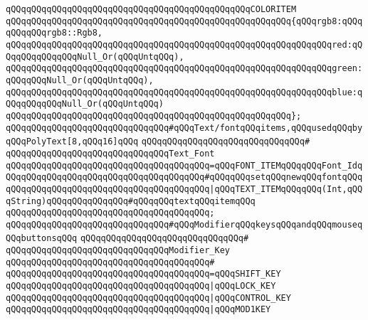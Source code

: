 \verb|qQQqqQQqqQQqqQQqqQQqqQQqqQQqqQQqqQQqqQQqqQQqqQQqCOLORITEM|\newline
\verb|qQQqqQQqqQQqqQQqqQQqqQQqqQQqqQQqqQQqqQQqqQQqqQQqqQQqqQQq{qQQqrgb8:qQQqqQQqqQQqrgb8::Rgb8,|\newline
\verb|qQQqqQQqqQQqqQQqqQQqqQQqqQQqqQQqqQQqqQQqqQQqqQQqqQQqqQQqqQQqqQQqred:qQQqqQQqqQQqqQQqNull_Or(qQQqUntqQQq),|\newline
\verb|qQQqqQQqqQQqqQQqqQQqqQQqqQQqqQQqqQQqqQQqqQQqqQQqqQQqqQQqqQQqqQQqgreen:qQQqqQQqNull_Or(qQQqUntqQQq),|\newline
\verb|qQQqqQQqqQQqqQQqqQQqqQQqqQQqqQQqqQQqqQQqqQQqqQQqqQQqqQQqqQQqqQQqblue:qQQqqQQqqQQqNull_Or(qQQqUntqQQq)|\newline
\verb|qQQqqQQqqQQqqQQqqQQqqQQqqQQqqQQqqQQqqQQqqQQqqQQqqQQqqQQq};|\newline
\newline
\verb|qQQqqQQqqQQqqQQqqQQqqQQqqQQqqQQq#qQQqText/fontqQQqitems,qQQqusedqQQqbyqQQqPolyText[8,qQQq16]qQQq|\newline
\verb|qQQqqQQqqQQqqQQqqQQqqQQqqQQqqQQq#|\newline
\verb|qQQqqQQqqQQqqQQqqQQqqQQqqQQqqQQqText_Font|\newline
\verb|qQQqqQQqqQQqqQQqqQQqqQQqqQQqqQQqqQQqqQQq=qQQqFONT_ITEMqQQqqQQqFont_IdqQQqqQQqqQQqqQQqqQQqqQQqqQQqqQQqqQQqqQQq#qQQqqQQqsetqQQqnewqQQqfontqQQq|\newline
\verb|qQQqqQQqqQQqqQQqqQQqqQQqqQQqqQQqqQQqqQQq|\verb#|qQQqTEXT_ITEMqQQqqQQq(Int,qQQqString)qQQqqQQqqQQqqQQq#\verb|#qQQqqQQqtextqQQqitemqQQq|\newline
\verb|qQQqqQQqqQQqqQQqqQQqqQQqqQQqqQQqqQQqqQQq;|\newline
\newline
\verb|qQQqqQQqqQQqqQQqqQQqqQQqqQQqqQQq#qQQqModifierqQQqkeysqQQqandqQQqmouseqQQqbuttonsqQQq|\newline
\verb|qQQqqQQqqQQqqQQqqQQqqQQqqQQqqQQq#|\newline
\verb|qQQqqQQqqQQqqQQqqQQqqQQqqQQqqQQqModifier_Key|\newline
\verb|qQQqqQQqqQQqqQQqqQQqqQQqqQQqqQQqqQQqqQQq#|\newline
\verb|qQQqqQQqqQQqqQQqqQQqqQQqqQQqqQQqqQQqqQQq=qQQqSHIFT_KEY|\newline
\verb|qQQqqQQqqQQqqQQqqQQqqQQqqQQqqQQqqQQqqQQq|\verb#|qQQqLOCK_KEY#\newline
\verb|qQQqqQQqqQQqqQQqqQQqqQQqqQQqqQQqqQQqqQQq|\verb#|qQQqCONTROL_KEY#\newline
\verb|qQQqqQQqqQQqqQQqqQQqqQQqqQQqqQQqqQQqqQQq|\verb#|qQQqMOD1KEY#\newline
